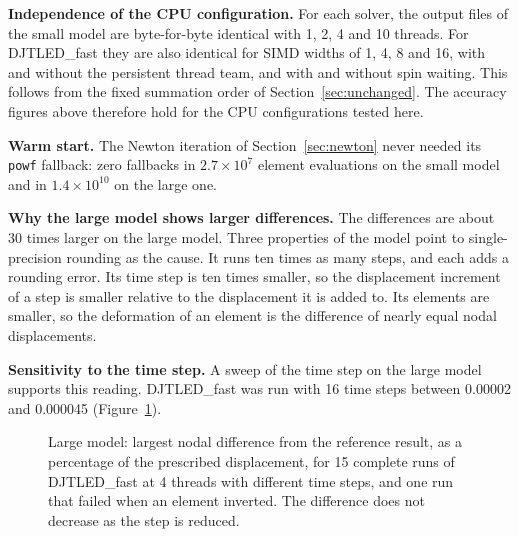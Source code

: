 \documentclass[11pt,a4paper]{article}
\newcommand{\DJF}{DJTLED\_fast}
\newcommand{\code}[1]{\texttt{#1}}
\begin{document}
\textbf{Independence of the CPU configuration.} For each solver, the output files of the small model are byte-for-byte identical with 1, 2, 4 and 10 threads. For \DJF{} they are also identical for SIMD widths of 1, 4, 8 and 16, with and without the persistent thread team, and with and without spin waiting. This follows from the fixed summation order of Section~\ref{sec:unchanged}. The accuracy figures above therefore hold for the CPU configurations tested here.

\textbf{Warm start.} The Newton iteration of Section~\ref{sec:newton} never needed its \code{powf} fallback: zero fallbacks in $2.7\times10^{7}$ element evaluations on the small model and in $1.4\times10^{10}$ on the large one.

\textbf{Why the large model shows larger differences.} The differences are about 30 times larger on the large model. Three properties of the model point to single-precision rounding as the cause. It runs ten times as many steps, and each adds a rounding error. Its time step is ten times smaller, so the displacement increment of a step is smaller relative to the displacement it is added to. Its elements are smaller, so the deformation of an element is the difference of nearly equal nodal displacements.

\textbf{Sensitivity to the time step.} A sweep of the time step on the large model supports this reading. \DJF{} was run with 16 time steps between 0.00002 and 0.000045 (Figure~\ref{fig:sweep}).

\begin{figure}[ht]
\centering
{}
\caption{Large model: largest nodal difference from the reference result, as a percentage of the prescribed displacement, for 15 complete runs of \DJF{} at 4 threads with different time steps, and one run that failed when an element inverted. The difference does not decrease as the step is reduced.}
\label{fig:sweep}
\end{figure}
\end{document}
